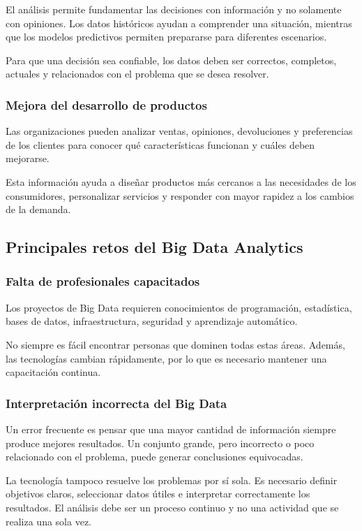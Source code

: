 El análisis permite fundamentar las decisiones con información y no solamente
con opiniones. Los datos históricos ayudan a comprender una situación,
mientras que los modelos predictivos permiten prepararse para diferentes
escenarios.

Para que una decisión sea confiable, los datos deben ser correctos, completos,
actuales y relacionados con el problema que se desea resolver.

\subsubsection*{Mejora del desarrollo de productos}

Las organizaciones pueden analizar ventas, opiniones, devoluciones y
preferencias de los clientes para conocer qué características funcionan y
cuáles deben mejorarse.

Esta información ayuda a diseñar productos más cercanos a las necesidades de
los consumidores, personalizar servicios y responder con mayor rapidez a los
cambios de la demanda.

\subsection{Principales retos del Big Data Analytics}

\subsubsection*{Falta de profesionales capacitados}

Los proyectos de Big Data requieren conocimientos de programación,
estadística, bases de datos, infraestructura, seguridad y aprendizaje
automático.

No siempre es fácil encontrar personas que dominen todas estas áreas. Además,
las tecnologías cambian rápidamente, por lo que es necesario mantener una
capacitación continua.

\subsubsection*{Interpretación incorrecta del Big Data}

Un error frecuente es pensar que una mayor cantidad de información siempre
produce mejores resultados. Un conjunto grande, pero incorrecto o poco
relacionado con el problema, puede generar conclusiones equivocadas.

La tecnología tampoco resuelve los problemas por sí sola. Es necesario definir
objetivos claros, seleccionar datos útiles e interpretar correctamente los
resultados. El análisis debe ser un proceso continuo y no una actividad que se
realiza una sola vez.


